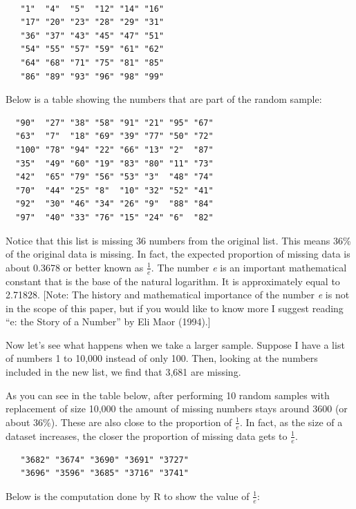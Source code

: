 \documentclass[12pt,twoside]{reedthesis}
\begin{document}
  \begin{verbatim}
  
   "1"  "4"  "5"  "12" "14" "16"
   "17" "20" "23" "28" "29" "31"
   "36" "37" "43" "45" "47" "51"
   "54" "55" "57" "59" "61" "62"
   "64" "68" "71" "75" "81" "85"
   "86" "89" "93" "96" "98" "99"
  \end{verbatim}
  
  Below is a table showing the numbers that are part of the random sample:
  
  \begin{verbatim}
  "90"  "27" "38" "58" "91" "21" "95" "67"
  "63"  "7"  "18" "69" "39" "77" "50" "72"
  "100" "78" "94" "22" "66" "13" "2"  "87"
  "35"  "49" "60" "19" "83" "80" "11" "73"
  "42"  "65" "79" "56" "53" "3"  "48" "74"
  "70"  "44" "25" "8"  "10" "32" "52" "41"
  "92"  "30" "46" "34" "26" "9"  "88" "84"
  "97"  "40" "33" "76" "15" "24" "6"  "82"   
  \end{verbatim}
  
  Notice that this list is missing 36 numbers from the original list. This
  means 36\% of the original data is missing. In fact, the expected
  proportion of missing data is about 0.3678 or better known as
  \(\frac{1}{e}\). The number \emph{e} is an important mathematical
  constant that is the base of the natural logarithm. It is approximately
  equal to 2.71828. {[}Note: The history and mathematical importance of
  the number \emph{e} is not in the scope of this paper, but if you would
  like to know more I suggest reading ``e: the Story of a Number'' by Eli
  Maor (1994).{]}
  
  Now let's see what happens when we take a larger sample. Suppose I have
  a list of numbers 1 to 10,000 instead of only 100. Then, looking at the
  numbers included in the new list, we find that 3,681 are missing.
  
  As you can see in the table below, after performing 10 random samples
  with replacement of size 10,000 the amount of missing numbers stays
  around 3600 (or about 36\%). These are also close to the proportion of
  \(\frac{1}{e}\). In fact, as the size of a dataset increases, the closer
  the proportion of missing data gets to \(\frac{1}{e}\).
  
  \begin{verbatim}
   "3682" "3674" "3690" "3691" "3727"
   "3696" "3596" "3685" "3716" "3741"
  \end{verbatim}
  
  Below is the computation done by R to show the value of \(\frac{1}{e}\):
  
\end{document}
